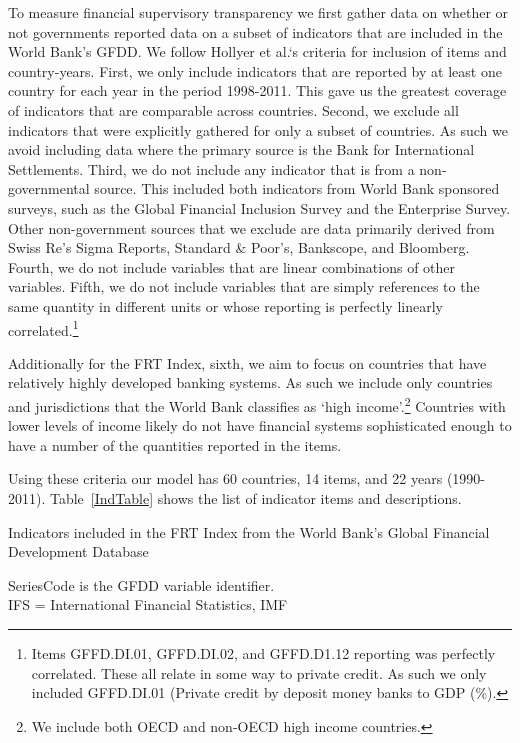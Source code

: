 \documentclass[a4paper]{article}
\begin{document}
To measure financial supervisory transparency we first gather data on whether or not governments reported data on a subset of indicators that are included in the World Bank's GFDD. We follow Hollyer et al.`s \citeyearpar{Hollyer2014} criteria for inclusion of items and country-years. First, we only include indicators that are reported by at least one country for each year in the period 1998-2011. This gave us the greatest coverage of indicators that are comparable across countries. Second, we exclude all indicators that were explicitly gathered for only a subset of countries. As such we avoid including data where the primary source is the Bank for International Settlements. Third, we do not include any indicator that is from a non-governmental source. This included both indicators from World Bank sponsored surveys, such as the Global Financial Inclusion Survey and the Enterprise Survey. Other non-government sources that we exclude are data primarily derived from Swiss Re's Sigma Reports, Standard \& Poor's, Bankscope, and Bloomberg. Fourth, we do not include variables that are linear combinations of other variables. Fifth, we do not include variables that are simply references to the same quantity in different units or whose reporting is perfectly linearly correlated.\footnote{Items GFFD.DI.01, GFFD.DI.02, and GFFD.D1.12 reporting was perfectly correlated. These all relate in some way to private credit. As such we only included GFFD.DI.01 (Private credit by deposit money banks to GDP (\%).}

Additionally for the FRT Index, sixth, we aim to focus on countries that have relatively highly developed banking systems. As such we include only countries and jurisdictions that the World Bank classifies as `high income'.\footnote{We include both OECD and non-OECD high income countries.} Countries with lower levels of income likely do not have financial systems sophisticated enough to have a number of the quantities reported in the items.

Using these criteria our model has 60 countries, 14 items, and 22 years (1990-2011). Table~\ref{IndTable} shows the list of indicator items and descriptions.

\begin{table}[ht]
    \caption{Indicators included in the FRT Index from the World Bank's Global Financial Development Database}
    \label{IndTable}
    \vspace{0.3cm}
    \scalebox{0.75}{
        
    }
    {\scriptsize{SeriesCode is the GFDD variable identifier.\\
    IFS = International Financial Statistics, IMF}}
\end{table}
\end{document}
